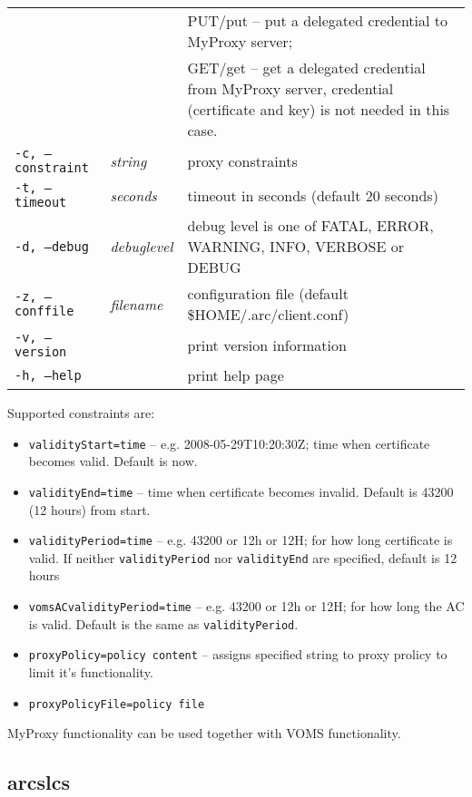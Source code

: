 \begin{longtable}{llp{8cm}}
   & &PUT/put -- put a delegated credential to MyProxy server;\\
   & &GET/get -- get a delegated credential from MyProxy server, credential (certificate and key) is not needed in this case.\\
   \texttt{-c, --constraint}& \textit{string} & proxy constraints\\
   \texttt{-t, --timeout}& \textit{seconds} & timeout in seconds (default 20 seconds)\\
   \texttt{-d, --debug}& \textit{debuglevel}&debug level is one of  FATAL, ERROR, WARNING, INFO, VERBOSE or DEBUG\\
   \texttt{-z, --conffile}&\textit{filename}& configuration file (default {\$}HOME/.arc/client.conf)\\
   \texttt{-v, --version}& & print version information\\
   \texttt{-h, --help}& & print help page\\
\end{longtable}

Supported constraints are:
\begin{itemize}
  \item \texttt{validityStart=time} -- e.g. 2008-05-29T10:20:30Z; time when certificate becomes valid. Default is now.
  \item \texttt{validityEnd=time} -- time when certificate becomes invalid. Default is 43200 (12 hours) from start.
  \item \texttt{validityPeriod=time} -- e.g. 43200 or 12h or 12H; for how long certificate is valid. If neither \texttt{validityPeriod} nor \texttt{validityEnd} are specified, default is 12 hours
  \item \texttt{vomsACvalidityPeriod=time} -- e.g. 43200 or 12h or 12H; for how long the AC is valid. Default is the same as \texttt{validityPeriod}.
  \item \texttt{proxyPolicy=policy content} -- assigns specified string to proxy prolicy to limit it's functionality.
  \item \texttt{proxyPolicyFile=policy file}
\end{itemize}

MyProxy functionality can be used together with VOMS functionality.


\subsection{arcslcs}
\label{sec:arcslcs}


